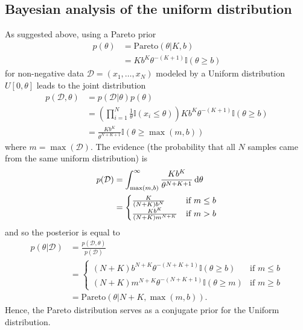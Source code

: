 \subsection{Bayesian analysis of the uniform distribution}
As suggested above, using a Pareto prior
\begin{align*}
p(\theta) &= \text{Pareto}(\theta | K, b)\\
&= Kb^K\theta^{-(K+1)}\mathbb{I}(\theta\geq b)
\end{align*}
for non-negative data $\mathcal{D} = (x_1, \dots, x_N)$ modeled by a Uniform distribution $U[0, \theta]$ leads to the joint distribution
\begin{align*}
p(\mathcal{D}, \theta) &= p(\mathcal{D} | \theta) p(\theta)\\
&= \left(\prod_{i=1}^N \frac{1}{\theta} \mathbb{I}(x_i \leq \theta)\right) Kb^K\theta^{-(K+1)}\mathbb{I}(\theta\geq b)\\
&= \frac{Kb^K}{\theta^{N+K+1}} \mathbb{I}(\theta \geq \max(m, b))
\end{align*}
where $m = \max(\mathcal{D})$. The evidence (the probability that all $N$ samples came from the same uniform distribution) is
\begin{align*}
p(\mathcal{D}) &= \int_{\max(m,b)}^\infty \frac{Kb^K}{\theta^{N+K+1}} \mathop{}\!\mathrm{d} \theta\\
&= \begin{cases}
\frac{K}{(N+K)b^N} &\text{if $m \leq b$}\\
\frac{Kb^K}{(N+K)m^{N+K}} &\text{if $m > b$}
\end{cases}
\end{align*}
and so the posterior is equal to
\begin{align*}
p(\theta|\mathcal{D}) &= \frac{p(\mathcal{D},\theta)}{p(\mathcal{D})}\\
&= \begin{cases}
(N+K)b^{N+K}\theta^{-(N+K+1)}\mathbb{I}(\theta\geq b) &\text{if $m\leq b$}\\
(N+K)m^{N+K}\theta^{-(N+K+1)}\mathbb{I}(\theta\geq m) &\text{if $m\geq b$}
\end{cases}\\
&= \mathrm{Pareto}(\theta|N+K, \max(m,b)).
\end{align*}
Hence, the Pareto distribution serves as a conjugate prior for the Uniform distribution.

